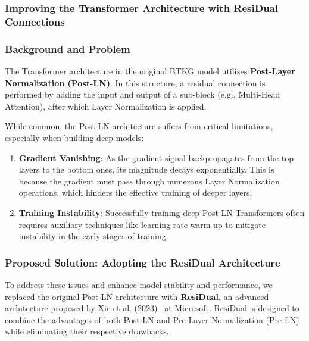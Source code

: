 \subsubsection{Improving the Transformer Architecture with ResiDual Connections}

\subsubsection*{Background and Problem}

The Transformer architecture in the original BTKG model utilizes \textbf{Post-Layer Normalization (Post-LN)}. In this structure, a residual connection is performed by adding the input and output of a sub-block (e.g., Multi-Head Attention), after which Layer Normalization is applied.

While common, the Post-LN architecture suffers from critical limitations, especially when building deep models:

\begin{enumerate}
    \item \textbf{Gradient Vanishing}: As the gradient signal backpropagates from the top layers to the bottom ones, its magnitude decays exponentially. This is because the gradient must pass through numerous Layer Normalization operations, which hinders the effective training of deeper layers.
    
    \item \textbf{Training Instability}: Successfully training deep Post-LN Transformers often requires auxiliary techniques like learning-rate warm-up to mitigate instability in the early stages of training.
\end{enumerate}

\subsubsection*{Proposed Solution: Adopting the ResiDual Architecture}

To address these issues and enhance model stability and performance, we replaced the original Post-LN architecture with \textbf{ResiDual}, an advanced architecture proposed by Xie et al. (2023)~\cite{ResiDual} at Microsoft. ResiDual is designed to combine the advantages of both Post-LN and Pre-Layer Normalization (Pre-LN) while eliminating their respective drawbacks.

